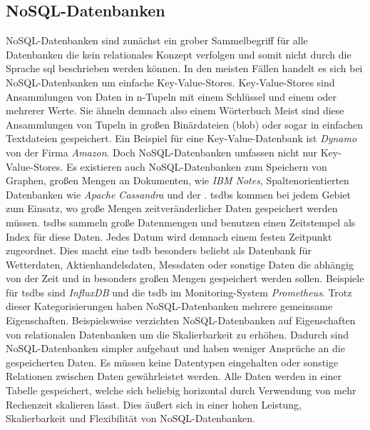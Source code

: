 \documentclass[titlepage]{report}
\begin{document}
\subsection*{NoSQL\hyp{}Datenbanken}
NoSQL\hyp{}Datenbanken sind zunächst ein grober Sammelbegriff für alle
Datenbanken die kein relationales Konzept verfolgen und somit nicht
durch die Sprache \gls{sql} beschrieben werden können. In den meisten
Fällen handelt es sich bei NoSQL\hyp{}Datenbanken um einfache
Key\hyp{}Value\hyp{}Stores. Key\hyp{}Value\hyp{}Stores sind Ansammlungen
von Daten in n\hyp{}Tupeln mit einem Schlüssel und einem oder mehrerer
Werte. Sie ähneln
demnach also einem Wörterbuch  Meist sind diese Ansammlungen von Tupeln
in großen Binärdateien (\gls{blob}) oder sogar in einfachen Textdateien
gespeichert. Ein Beispiel für eine Key\hyp{}Value\hyp{}Datenbank ist
\emph{Dynamo} von der Firma \emph{Amazon}. Doch NoSQL\hyp{}Datenbanken
umfassen nicht nur Key\hyp{}Value\hyp{}Stores. Es existieren auch
NoSQL\hyp{}Datenbanken zum Speichern von Graphen, großen Mengen an
Dokumenten, wie \emph{IBM Notes}, Spaltenorientierten Datenbanken wie
\emph{Apache Cassandra} und der . \glspl{tsdb} kommen bei
jedem Gebiet zum Einsatz, wo große Mengen zeitveränderlicher Daten
gespeichert werden müssen. \glspl{tsdb} sammeln große Datenmengen und
benutzen einen Zeitstempel als Index für diese Daten. Jedes Datum wird
demnach einem festen Zeitpunkt zugeordnet. Dies macht eine \gls{tsdb}
besonders beliebt als Datenbank für Wetterdaten,
Aktienhandelsdaten, Messdaten oder sonstige Daten die abhängig von der
Zeit und in besonders großen Mengen gespeichert werden sollen. Beispiele
für \glspl{tsdb} sind \emph{InfluxDB} und die \gls{tsdb} im
Monitoring-System \emph{Prometheus}. Trotz dieser Kategorisierungen
haben NoSQL\hyp{}Datenbanken mehrere gemeinsame Eigenschaften.
Beispielsweise verzichten NoSQL\hyp{}Datenbanken auf Eigenschaften von
relationalen Datenbanken um die Skalierbarkeit zu erhöhen\cite[S. 13]{TSDB}. Dadurch sind
NoSQL\hyp{}Datenbanken simpler aufgebaut und haben weniger Ansprüche an
die gespeicherten Daten. Es müssen keine Datentypen eingehalten oder
sonstige Relationen zwischen Daten gewährleistet werden. Alle Daten
werden in einer Tabelle gespeichert, welche sich beliebig horizontal
durch Verwendung von mehr Rechenzeit skalieren lässt. Dies äußert sich
in einer hohen Leistung, Skalierbarkeit und Flexibilität von
NoSQL\hyp{}Datenbanken\cite{NOSQL}.
\end{document}

